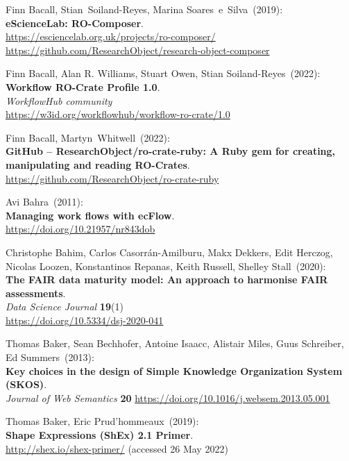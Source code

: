 \begin{thebibliography}{9}
Finn Bacall, Stian~Soiland-Reyes, Marina Soares~e~Silva~(2019): \\
\textbf{eScienceLab: RO-Composer}.\\
\url{https://esciencelab.org.uk/projects/ro-composer/}\\
\url{https://github.com/ResearchObject/research-object-composer}

Finn Bacall, Alan R. Williams, Stuart Owen, Stian
Soiland-Reyes~(2022): \\
\textbf{Workflow RO-Crate Profile 1.0}.\\
\emph{WorkflowHub community}\\
\url{https://w3id.org/workflowhub/workflow-ro-crate/1.0}

Finn Bacall, Martyn~Whitwell~(2022): \\
\textbf{GitHub -- ResearchObject/ro-crate-ruby: A Ruby gem for creating,
manipulating and reading RO-Crates}.\\
\url{https://github.com/ResearchObject/ro-crate-ruby}

Avi Bahra~(2011): \\
\textbf{Managing work flows with ecFlow}.\\
\url{https://doi.org/10.21957/nr843dob}

Christophe Bahim, Carlos Casorrán-Amilburu, Makx Dekkers, Edit Herczog, Nicolas Loozen, Konstantinos Repanas, Keith Russell, Shelley Stall~(2020): \\
\textbf{The FAIR data maturity model: An approach to harmonise FAIR assessments}.\\
\emph{Data Science Journal} \textbf{19}(1)\\
\url{https://doi.org/10.5334/dsj-2020-041}

Thomas Baker, Sean Bechhofer, Antoine Isaacc, Alistair Miles, Guus Schreiber, Ed Summers~(2013): \\
\textbf{Key choices in the design of Simple Knowledge Organization System (SKOS)}.\\
\emph{Journal of Web Semantics} \textbf{20}
\url{https://doi.org/10.1016/j.websem.2013.05.001}

Thomas Baker, Eric Prud'hommeaux~(2019): \\
\textbf{Shape {Expressions} ({ShEx}) 2.1 {Primer}}. \\
\url{http://shex.io/shex-primer/} (accessed 26 May 2022)


\end{thebibliography}
